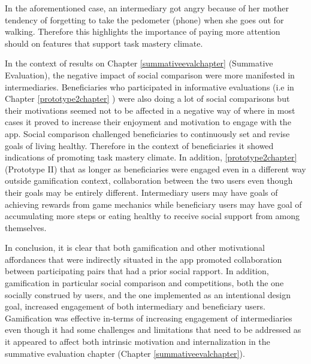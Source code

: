 In the aforementioned case, an intermediary got angry because of her mother tendency of forgetting to take the pedometer (phone) when she goes out for walking. Therefore this highlights the importance of paying more attention should on features that support task mastery climate. 

In the context of results on Chapter \ref{summativeevalchapter} (Summative Evaluation), the negative impact of social comparison were more manifested in intermediaries. Beneficiaries who participated in informative evaluations (i.e in Chapter \ref{prototype2chapter} ) were also doing a lot of social comparisons but their motivations seemed not to be affected in a negative way of where in most cases it proved to increase their enjoyment and motivation to engage with the app. Social comparison challenged beneficiaries to continuously set and revise goals of living healthy. Therefore in the context of beneficiaries it showed indications of promoting task mastery climate.  In addition,  \ref{prototype2chapter} (Prototype II) that as longer as beneficiaries were engaged even in a different way outside gamification context, collaboration between the two users even though their goals may be entirely different. Intermediary users may have goals of achieving rewards from game mechanics while beneficiary users may have goal of accumulating more steps or eating healthy to receive social support from among themselves.

In conclusion, it is clear that both gamification and other motivational affordances that were indirectly situated in the app promoted collaboration between participating pairs that had a prior social rapport. In addition, gamification in particular social comparison and competitions, both the one socially construed by users, and the one implemented as an intentional design goal, increased engagement of both intermediary and beneficiary users.
Gamification was effective in-terms of increasing engagement of intermediaries even though it had some challenges and limitations that need to be addressed as it appeared to affect both intrinsic motivation and internalization in the summative evaluation chapter (Chapter \ref{summativeevalchapter}).
 

